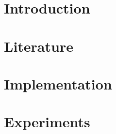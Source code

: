 \documentclass[twoside]{ctuthesis}
\theoremstyle{plain}
\theoremstyle{definition}
\theoremstyle{note}
\begin{document}
\maketitle

\chapter{Introduction}


\chapter{Literature}







\chapter{Implementation}


\chapter{Experiments}
%

%

%

\appendix

\printindex






\end{document}
